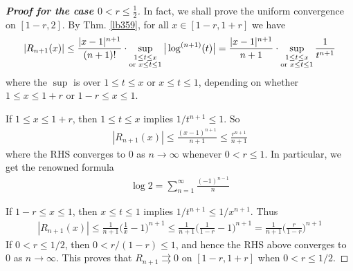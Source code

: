 \documentclass[12pt,b5paper,notitlepage]{article}
\theoremstyle{definition}
\theoremstyle{plain}
\numberwithin{equation}{section}
\begin{document}
\begin{proof}[\textbf{Proof for the case $0<r\leq \frac 12$}] In fact, we shall prove the uniform convergence on $[1-r,2]$. 
By Thm. \ref{lb359}, for all $x\in[1-r,1+r]$ we have
\begin{align*}
|R_{n+1}(x)|\leq \frac{|x-1|^{n+1}}{(n+1)!}\cdot\sup_{
\begin{subarray}{c}
1\leq t\leq x\\
\text{or }x\leq t\leq 1
\end{subarray}
}
\big|\log^{(n+1)}(t)\big|=\frac{|x-1|^{n+1}}{n+1}\cdot\sup_{
\begin{subarray}{c}
1\leq t\leq x\\
\text{or }x\leq t\leq 1
\end{subarray}
}\frac 1{t^{n+1}}
\end{align*}
where the $\sup$ is over $1\leq t\leq x$ or $x\leq t\leq 1$, depending on whether $1\leq x\leq 1+r$ or $1-r\leq x\leq 1$.

If $1\leq x\leq 1+r$, then $1\leq t\leq x$ implies $1/t^{n+1}\leq 1$. So
\begin{align*}
|R_{n+1}(x)|\leq\frac{(x-1)^{n+1}}{n+1}\leq\frac{r^{n+1}}{n+1} 
\end{align*}
where the RHS converges to $0$ as $n\rightarrow\infty$ whenever $0<r\leq 1$. In particular, we get the renowned formula
\begin{align}
\log 2=\sum_{n=1}^\infty \frac{(-1)^{n-1}}n
\end{align}

If $1-r\leq x\leq 1$, then $x\leq t\leq 1$ implies $1/t^{n+1}\leq 1/x^{n+1}$. Thus
\begin{align*}
|R_{n+1}(x)|\leq\frac 1{n+1}\Big(\frac 1x-1 \Big)^{n+1}\leq \frac 1{n+1}\Big(\frac 1{1-r}-1 \Big)^{n+1}=\frac 1{n+1}\Big(\frac r{1-r}\Big)^{n+1}
\end{align*}
If $0<r\leq 1/2$, then $0<r/(1-r)\leq 1$, and hence the RHS above converges to $0$ as $n\rightarrow\infty$. This proves that $R_{n+1}\rightrightarrows0$ on $[1-r,1+r]$ when $0<r\leq1/2$.
\end{proof}
\end{document}
